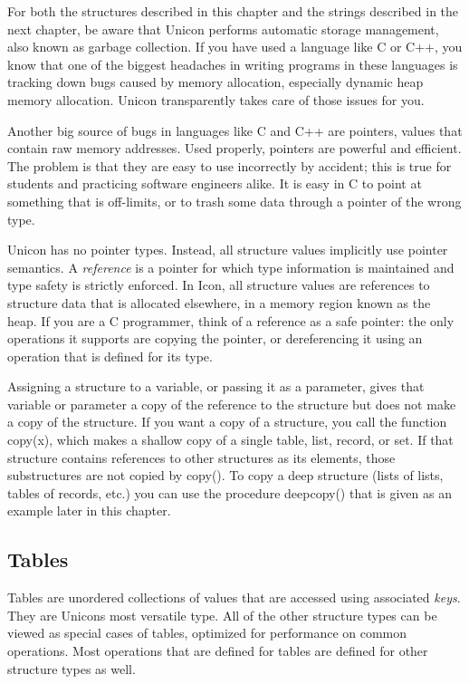 For both the structures described in this chapter and the strings
described in the next chapter, be aware that Unicon performs
automatic storage management, also
known as garbage collection. If you have used
a language like C or C++, you know that one of the biggest headaches in
writing programs in these languages is tracking down bugs caused by
memory allocation, especially dynamic heap
memory allocation. Unicon transparently takes care of those issues for
you.

Another big source of bugs in languages like C and C++ are
pointers, values that contain raw memory addresses. Used properly, pointers are powerful and
efficient. The problem is that they are easy to use incorrectly by
accident; this is true for students and practicing software engineers
alike. It is easy in C to point at something that is off-limits, or to
trash some data through a pointer of the wrong type.

Unicon has no pointer types. Instead, all structure values implicitly
use pointer semantics. A \textit{reference} is a
pointer for which type information is maintained and type safety is
strictly enforced. In Icon, all structure values are references to
structure data that is allocated elsewhere, in a memory region known as
the heap. If you are a C programmer, think of a reference as a safe
pointer: the only operations it supports are copying the pointer, or
dereferencing it using an operation that is defined for its type.

Assigning a structure to a variable, or passing it as a
parameter, gives that variable or parameter a copy of
the reference to the structure but does not make a copy of the
structure. If you want a copy of a structure, you call the function
\textsf{copy(x)}, which makes a {\textquotedbl}shallow{\textquotedbl}
copy of a single table, list, record, or set. If that structure
contains references to other structures as its elements, those
substructures are not copied by \textsf{copy()}. To copy a
{\textquotedbl}deep{\textquotedbl} structure (lists of lists, tables of
records, etc.) you can use the procedure \textsf{deepcopy()} that is
given as an example later in this chapter.

\subsection{Tables}
Tables are unordered collections of values that
are accessed using associated \textit{keys}. They are Unicon{\textquotesingle}s most versatile
type. All of the other structure types can be viewed as special cases
of tables, optimized for performance on common operations. Most
operations that are defined for tables are defined for other structure
types as well.

